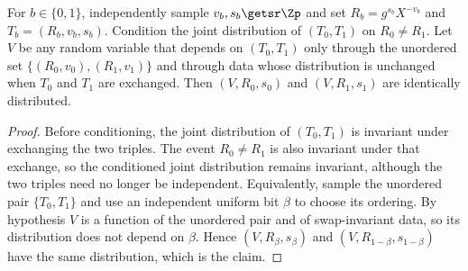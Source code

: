 \begin{lemma} \label{lem-swap}
For $b\in\{0,1\}$, independently sample $v_b,s_b\getsr\Zp$ and set $R_b=g^{s_b}X^{-v_b}$ and $T_b=(R_b,v_b,s_b)$. Condition the joint distribution of $(T_0,T_1)$ on $R_0\ne R_1$. Let $V$ be any random variable that depends on $(T_0,T_1)$ only through the unordered set $\{(R_0,v_0),(R_1,v_1)\}$ and through data whose distribution is unchanged when $T_0$ and $T_1$ are exchanged. Then $(V,R_0,s_0)$ and $(V,R_1,s_1)$ are identically distributed.
\end{lemma}

\begin{proof}
Before conditioning, the joint distribution of $(T_0,T_1)$ is invariant under exchanging the two triples. The event $R_0\ne R_1$ is also invariant under that exchange, so the conditioned joint distribution remains invariant, although the two triples need no longer be independent. Equivalently, sample the unordered pair $\{T_0,T_1\}$ and use an independent uniform bit $\beta$ to choose its ordering. By hypothesis $V$ is a function of the unordered pair and of swap-invariant data, so its distribution does not depend on $\beta$. Hence $(V,R_\beta,s_\beta)$ and $(V,R_{1-\beta},s_{1-\beta})$ have the same distribution, which is the claim.
\end{proof}

